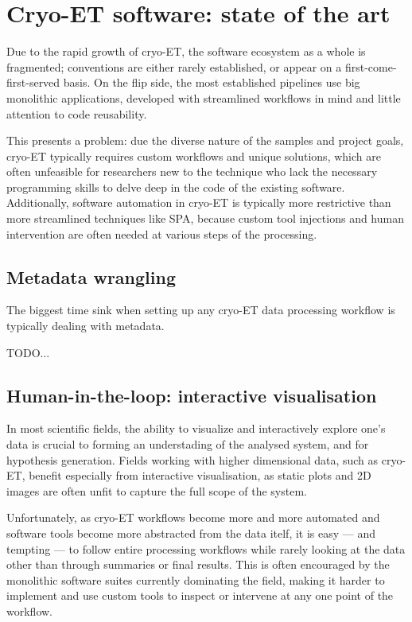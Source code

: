 \chapter[Cryo-ET software]{Cryo-ET software: state of the art}

Due to the rapid growth of cryo-ET, the software ecosystem as a whole is fragmented; conventions are either rarely established, or appear on a first-come-first-served basis.
On the flip side, the most established pipelines use big monolithic applications, developed with streamlined workflows in mind and little attention to code reusability.

This presents a problem: due the diverse nature of the samples and project goals, cryo-ET typically requires custom workflows and unique solutions, which are often unfeasible for researchers new to the technique who lack the necessary programming skills to delve deep in the code of the existing software.
Additionally, software automation in cryo-ET is typically more restrictive than more streamlined techniques like SPA, because custom tool injections and human intervention are often needed at various steps of the processing.

\section{Metadata wrangling}

The biggest time sink when setting up any cryo-ET data processing workflow is typically dealing with metadata.

TODO...

\section{Human-in-the-loop: interactive visualisation}

In most scientific fields, the ability to visualize and interactively explore one's data is crucial to forming an understading of the analysed system, and for hypothesis generation.
Fields working with higher dimensional data, such as cryo-ET, benefit especially from interactive visualisation, as static plots and 2D images are often unfit to capture the full scope of the system.

Unfortunately, as cryo-ET workflows become more and more automated and software tools become more abstracted from the data itelf, it is easy --- and tempting --- to follow entire processing workflows while rarely looking at the data other than through summaries or final results.
This is often encouraged by the monolithic software suites currently dominating the field, making it harder to implement and use custom tools to inspect or intervene at any one point of the workflow.

